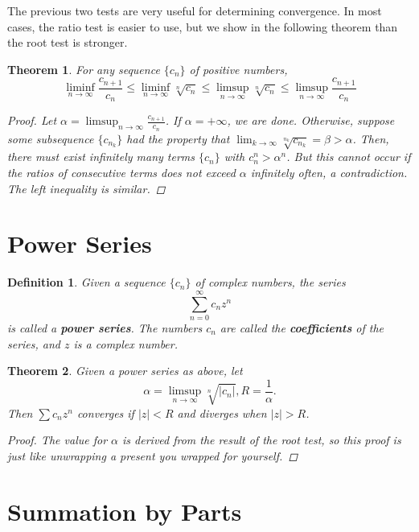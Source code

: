 \documentclass{scrbook}
\renewcommand{\to}{\rightarrow}
\newtheorem{theorem}{Theorem}
\newtheorem{definition}{Definition}
\begin{document}
The previous two tests are very useful for determining convergence. In most cases, the ratio test is easier to use, but we show in the following theorem than the root test is stronger.

\begin{theorem} %
For any sequence $\{c_n\}$ of positive numbers,
\[
	\liminf_{n \to \infty} \frac{c_{n+1}}{c_n} \le \liminf_{n \to \infty} \sqrt[n]{c_n} \le \limsup_{n \to \infty} \sqrt[n]{c_n} \le \limsup_{n \to \infty} \frac{c_{n+1}}{c_n}
\]

\begin{proof}
Let $\alpha = \limsup_{n \to \infty} \frac{c_{n+1}}{c_n}$. If $\alpha = +\infty$, we are done. Otherwise, suppose some subsequence $\{c_{n_k}\}$ had the property that $\lim_{k \to \infty} \sqrt[n_k]{c_{n_k}} = \beta > \alpha$. Then, there must exist infinitely many terms $\{c_n\}$ with $c_n^n > \alpha^n$. But this cannot occur if the ratios of consecutive terms does not exceed $\alpha$ infinitely often, a contradiction. The left inequality is similar.
\end{proof}
\end{theorem}

\section{Power Series}

\begin{definition} %
Given a sequence $\{c_n\}$ of complex numbers, the series
\[
	\sum_{n=0}^{\infty} c_nz^n
\]
is called a \textbf{power series}. The numbers $c_n$ are called the \textbf{coefficients} of the series, and $z$ is a complex number.
\end{definition}

\begin{theorem} %
Given a power series as above, let
\[
	\alpha = \limsup_{n \to \infty} \sqrt[n]{|c_n|}, R = \frac{1}{\alpha}.
\]
Then $\sum c_nz^n$ converges if $|z| < R$ and diverges when $|z| > R$.

\begin{proof}
The value for $\alpha$ is derived from the result of the root test, so this proof is just like unwrapping a present you wrapped for yourself.
\end{proof}
\end{theorem}

\section{Summation by Parts}
\end{document}
